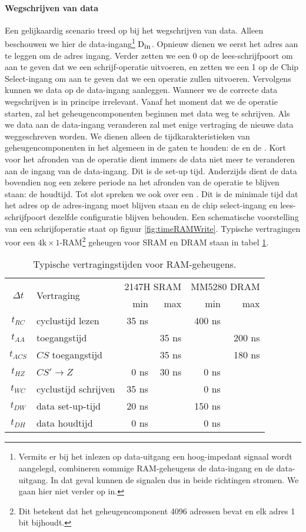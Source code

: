 \paragraph{Wegschrijven van data}
Een gelijkaardig scenario treed op bij het wegschrijven van data. Alleen beschouwen we hier de data-ingang\footnote{Vermits er bij het inlezen op data-uitgang een hoog-impedant signaal wordt aangelegd, combineren sommige RAM-geheugens de data-ingang en de data-uitgang. In dat geval kunnen de signalen dus in beide richtingen stromen. We gaan hier niet verder op in.} $\mbox{D}_{\mbox{\small{in}}}$. Opnieuw dienen we eerst het adres aan te leggen om de adres ingang. Verder zetten we een 0 op de lees-schrijfpoort om aan te geven dat we een schrijf-operatie uitvoeren, en zetten we een 1 op de Chip Select-ingang om aan te geven dat we een operatie zullen uitvoeren. Vervolgens kunnen we data op de data-ingang aanleggen. Wanneer we de correcte data wegschrijven is in principe irrelevant. Vanaf het moment dat we de operatie starten, zal het geheugencomponenten beginnen met data weg te schrijven. Als we data aan de data-ingang veranderen zal met enige vertraging de nieuwe data weggeschreven worden. We dienen alleen de tijdkarakteristieken van geheugencomponenten in het algemeen in de gaten te houden: de  en de . Kort voor het afronden van de operatie dient immers de data niet meer te veranderen aan de ingang van de data-ingang. Dit is de set-up tijd. Anderzijds dient de data bovendien nog een zekere periode na het afronden van de operatie te blijven staan: de houdtijd. Tot slot spreken we ook over een . Dit is de minimale tijd dat het adres op de adres-ingang moet blijven staan en de chip select-ingang en lees-schrijfpoort dezelfde configuratie blijven behouden. Een schematische voorstelling van een schrijfoperatie staat op figuur \ref{fig:timeRAMWrite}. Typische vertragingen voor een $4\mbox{k}\times1$-RAM\footnote{Dit betekent dat het geheugencomponent 4096 adressen bevat en elk adres 1 bit bijhoudt.} geheugen voor SRAM en DRAM staan in tabel \ref{tbl:rAMDelaySamples}.
\begin{table}[hbt]
\centering
\begin{tabular}{cl|rr|rr}
\multirow{2}{*}{$\Delta t$}&\multirow{2}{*}{Vertraging}&\multicolumn{2}{c|}{2147H SRAM}&\multicolumn{2}{c}{MM5280 DRAM}\\
&&min&max&min&max\\
\hline
$t_{RC}$&cyclustijd lezen&35 ns&&400 ns&\\
$t_{AA}$&toegangstijd&&35 ns&&200 ns\\
$t_{ACS}$&$CS$ toegangstijd&&35 ns&&180 ns\\
$t_{HZ}$&$CS'\rightarrow Z$&0 ns&30 ns&0 ns&\\\hline
$t_{WC}$&cyclustijd schrijven&35 ns&&0 ns&\\
$t_{DW}$&data set-up-tijd&20 ns&&150 ns&\\
$t_{DH}$&data houdtijd&0 ns&&0 ns&\\
\end{tabular}
\caption{Typische vertragingstijden voor RAM-geheugens.}
\label{tbl:rAMDelaySamples}
\end{table}
